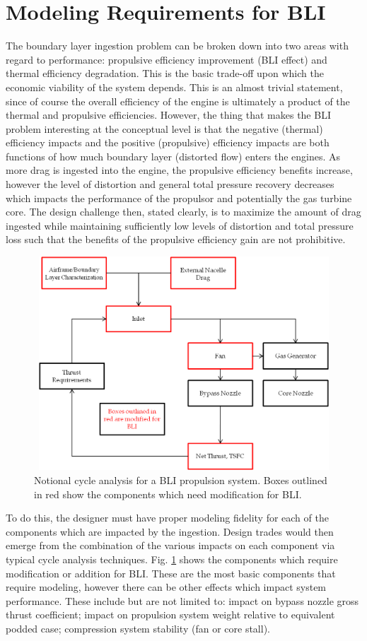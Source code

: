 \documentclass[12pt]{gatech-thesis}
\begin{document}
\section{Modeling Requirements for BLI}
The boundary layer ingestion problem can be broken down into two areas with regard to performance:  propulsive efficiency improvement (BLI effect) and thermal efficiency degradation.  This is the basic trade-off upon which the economic viability of the system depends.  This is an almost trivial statement, since of course the overall efficiency of the engine is ultimately a product of the thermal and propulsive efficiencies.  However, the thing that makes the BLI problem interesting at the conceptual level is that the negative (thermal) efficiency impacts and the positive (propulsive) efficiency impacts are both functions of how much boundary layer (distorted flow) enters the engines.  As more drag is ingested into the engine, the propulsive efficiency benefits increase, however the level of distortion and general total pressure recovery decreases which impacts the performance of the propulsor and potentially the gas turbine core.  The design challenge then, stated clearly, is to maximize the amount of drag ingested while maintaining sufficiently low levels of distortion and total pressure loss such that the benefits of the propulsive efficiency gain are not prohibitive.  
\begin{figure}[htpb]
\centering
\includegraphics[width=140mm, height =80mm, trim=0mm 0mm 0mm 0mm, clip=true]{Figure2_Cycle_Analysis_with_BLI.png}
\caption{Notional cycle analysis for a BLI propulsion system.  Boxes outlined in red show the components which need modification for BLI.}
\label{BLI_changes}
\end{figure}
To do this, the designer must have proper modeling fidelity for each of the components which are impacted by the ingestion.  Design trades would then emerge from the combination of the various impacts on each component via typical cycle analysis techniques.  Fig. \ref{BLI_changes} shows the components which require modification or addition for BLI.  These are the most basic components that require modeling, however there can be other effects which impact system performance.  These include but are not limited to: impact on bypass nozzle gross thrust coefficient; impact on propulsion system weight relative to equivalent podded case; compression system stability (fan or core stall).
\end{document}
